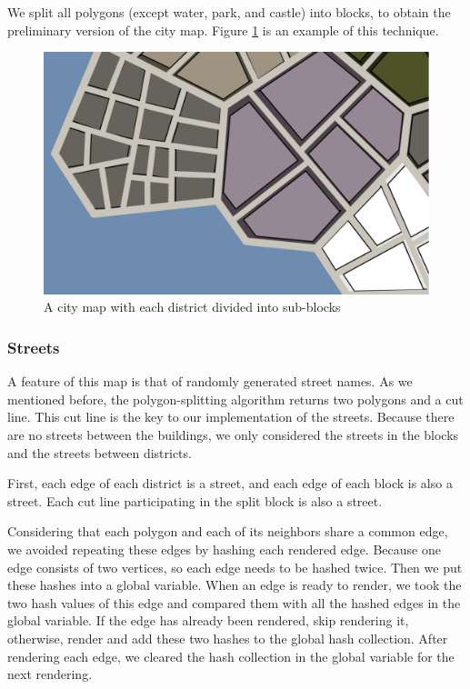 We split all polygons (except water, park, and castle) into blocks, to obtain the preliminary version of the city map. Figure \ref{fig:blocks} is an example of this technique.

\begin{figure}[htbp]
  \centering
  \includegraphics[width=\textwidth]{section04/assets/Map-blocks-no-buildings.png}
  \caption{A city map with each district divided into sub-blocks}
  \label{fig:blocks}
\end{figure}

\subsubsection{Streets}
A feature of this map is that of randomly generated street names. As we mentioned before, the polygon-splitting algorithm returns two polygons and a cut line. This cut line is the key to our implementation of the streets. Because there are no streets between the buildings, we only considered the streets in the blocks and the streets between districts.

First, each edge of each district is a street, and each edge of each block is also a street. Each cut line participating in the split block is also a street.

Considering that each polygon and each of its neighbors share a common edge, we avoided repeating these edges by hashing each rendered edge. Because one edge consists of two vertices, so each edge needs to be hashed twice. Then we put these hashes into a global variable. When an edge is ready to render, we took the two hash values of this edge and compared them with all the hashed edges in the global variable. If the edge has already been rendered, skip rendering it, otherwise, render and add these two hashes to the global hash collection. After rendering each edge, we cleared the hash collection in the global variable for the next rendering.

